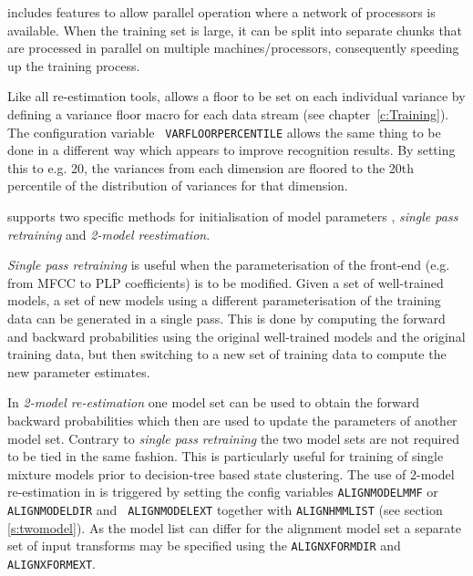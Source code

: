  includes features to allow parallel operation where a network
of processors is available. When the training set is large, it can be split into separate chunks that are processed in parallel on multiple machines/processors, consequently speeding up the training process. 

Like all re-estimation tools,  allows a floor to be set on
each individual variance by defining a variance floor macro for each data
stream (see chapter~\ref{c:Training}).  The configuration variable {\tt
VARFLOORPERCENTILE} allows the same thing to be done in a different way
which appears to improve recognition results.  By setting this to e.g. 20,
the variances from each dimension are floored to the 20th percentile of the
distribution of variances for that dimension.



 supports two specific methods for initialisation of
model parameters , \textit{single pass retraining} and \textit{2-model
  reestimation}.

\textit{Single pass retraining} is useful when the parameterisation of
the front-end (e.g. from MFCC to PLP coefficients) is to be modified.
Given a set of well-trained models, a set of new models using a
different parameterisation of the training data can be generated in a
single pass.  This is done by computing the forward and backward
probabilities using the original well-trained models and the original
training data, but then switching to a new set of training data to
compute the new parameter estimates.

In \textit{2-model re-estimation} one model set can be used to obtain
the forward backward probabilities which then are used to update the
parameters of another model set. Contrary to \textit{single pass
  retraining} the two model sets are not required to be tied in the
same fashion.  This is particularly useful for training of single
mixture models prior to decision-tree based state clustering. The use
of 2-model re-estimation in  is triggered by setting the
config variables {\tt ALIGNMODELMMF} or {\tt ALIGNMODELDIR} and {\tt
  ALIGNMODELEXT} together with {\tt ALIGNHMMLIST} (see section \ref{s:twomodel}).
As the model list can differ for the alignment model set a separate set of
input transforms may be specified using the {\tt ALIGNXFORMDIR} and
{\tt ALIGNXFORMEXT}. 

